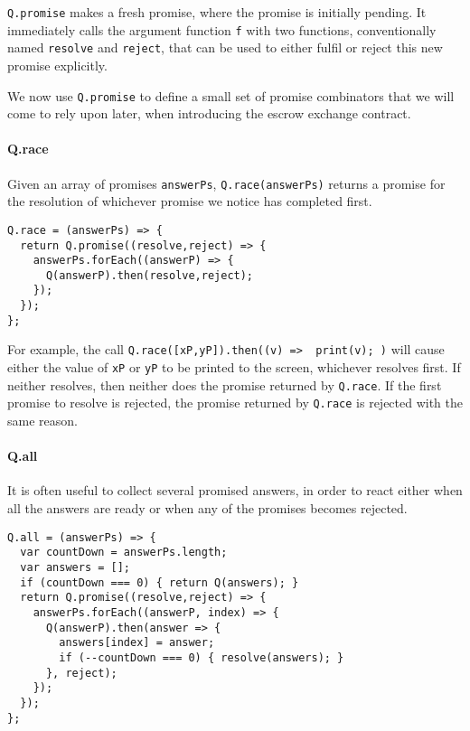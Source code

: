\documentclass{llncs}
\begin{document}
\texttt{Q.promise} makes a fresh promise, where the promise is initially pending. It immediately calls the argument function \texttt{f} with two functions, conventionally named \texttt{resolve} and \texttt{reject}, that can be used to either fulfil or reject this new promise explicitly.

We now use \texttt{Q.promise} to define a small set of promise combinators that we will come to rely upon later, when introducing the escrow exchange contract.

\paragraph{Q.race} Given an array of promises \texttt{answerPs}, \texttt{Q.race(answerPs)} returns a promise for the resolution of whichever promise we notice has completed first.

\begin{verbatim}
Q.race = (answerPs) => {
  return Q.promise((resolve,reject) => {
    answerPs.forEach((answerP) => {
      Q(answerP).then(resolve,reject);
    });
  });
};
\end{verbatim}

For example, the call \texttt{Q.race([xP,yP]).then((v) => { print(v); })} will cause either the value of \texttt{xP} or \texttt{yP} to be printed to the screen, whichever resolves first. If neither resolves, then neither does the promise returned by \texttt{Q.race}. If the first promise to resolve is rejected, the promise returned by \texttt{Q.race} is rejected with the same reason.

\paragraph{Q.all} It is often useful to collect several promised answers, in order to react either when all the answers are ready or when any of the promises becomes rejected.

\begin{verbatim}
Q.all = (answerPs) => {
  var countDown = answerPs.length;
  var answers = [];
  if (countDown === 0) { return Q(answers); }
  return Q.promise((resolve,reject) => {
    answerPs.forEach((answerP, index) => {
      Q(answerP).then(answer => {
        answers[index] = answer;
        if (--countDown === 0) { resolve(answers); }
      }, reject);
    });
  });
};  
\end{verbatim}
\end{document}
